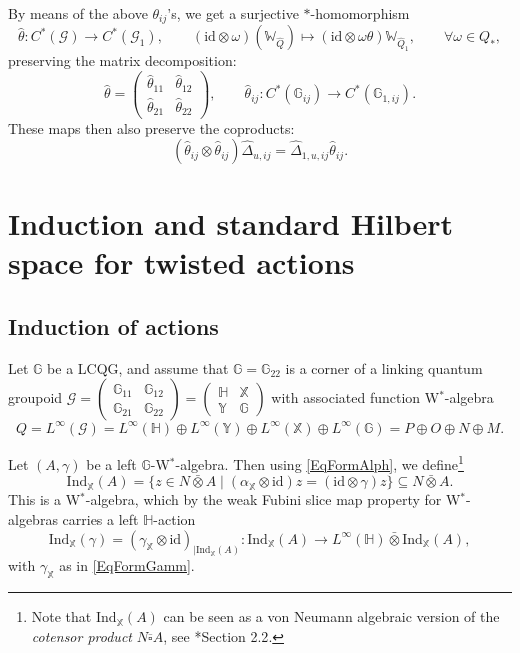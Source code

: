 \documentclass[reqno]{amsart}
\numberwithin{equation}{section}
\newcommand{\id}{\mathrm{id}}
\newcommand{\G}{\mathbb{G}}
\newcommand{\Hh}{\mathbb{H}}
\newcommand{\X}{\mathbb{X}}
\newcommand{\Y}{\mathbb{Y}}
\newcommand{\msG}{\mathscr{G}}
\newcommand{\Ind}{\mathrm{Ind}}
\newcommand{\Ww}{\mathds{W}}
\begin{document}
By means of the above $\theta_{ij}$'s, we get a surjective $*$-homomorphism 
\[
\hat{\theta}\colon C^*(\msG) \rightarrow C^*(\msG_1),\qquad (\id\otimes \omega)(\Ww_{\hat{Q}}) \mapsto (\id\otimes \omega\theta)\Ww_{\hat{Q}_1},\qquad \forall \omega \in Q_*, 
\]
preserving the matrix decomposition: 
\[
\hat{\theta} = \begin{pmatrix} \hat{\theta}_{11}& \hat{\theta}_{12}\\ \hat{\theta}_{21} & \hat{\theta}_{22}\end{pmatrix},\qquad \hat{\theta}_{ij}\colon C^*(\G_{ij})\rightarrow C^*(\G_{1,ij}). 
\]
These maps then also preserve the coproducts: 
\[
(\hat{\theta}_{ij}\otimes \hat{\theta}_{ij})\hat{\Delta}_{u,ij} = \hat{\Delta}_{1,u,ij}\hat{\theta}_{ij}. 
\]



\section{Induction and standard Hilbert space for twisted actions}

\subsection{Induction of actions}

Let $\G$ be a LCQG, and assume that $\G = \G_{22}$ is a corner of a linking quantum groupoid $\msG = \begin{pmatrix} \G_{11} & \G_{12}\\ \G_{21} & \G_{22}\end{pmatrix}= \begin{pmatrix} \Hh & \X \\ \Y & \G\end{pmatrix}$ with associated function W$^*$-algebra 
\[
Q = L^{\infty}(\msG) = L^{\infty}(\Hh)\oplus L^{\infty}(\Y)\oplus L^{\infty}(\X)\oplus L^{\infty}(\G) = P \oplus O\oplus N\oplus M. 
\] 

Let $(A,\gamma)$ be a left $\G$-W$^*$-algebra. Then using \eqref{EqFormAlph}, we define\footnote{Note that $\Ind_{\X}(A)$ can be seen as a von Neumann algebraic version of the \emph{cotensor product} $N\overline{\square}A$, see \cite{HS20}*{Section 2.2}.}
\begin{equation}\label{EqInductionAction}
\Ind_{\X}(A) =  \{z\in N \bar{\otimes}A\mid (\alpha_{\X}\otimes \id)z = (\id\otimes \gamma)z\} \subseteq N\bar{\otimes}A.
\end{equation}
This is a W$^*$-algebra, which by the weak Fubini slice map property for W$^*$-algebras carries a left $\Hh$-action
\[
\Ind_{\X}(\gamma) = (\gamma_{\X}\otimes \id)_{\mid \Ind_{\X}(A)}\colon  \Ind_{\X}(A)  \rightarrow L^{\infty}(\Hh)\bar{\otimes} \Ind_{\X}(A),
\]
with $\gamma_{\X}$ as in \eqref{EqFormGamm}.
\end{document}
